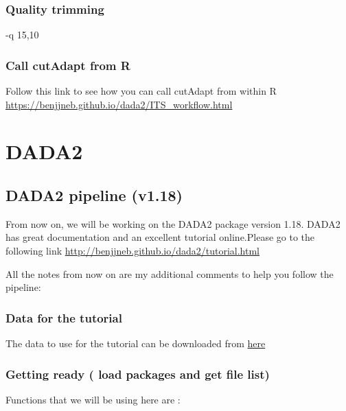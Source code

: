 \documentclass[
]{book}
\begin{document}
\hypertarget{quality-trimming}{%
\subsection{Quality trimming}\label{quality-trimming}}

-q 15,10

\hypertarget{call-cutadapt-from-r}{%
\subsection{Call cutAdapt from R}\label{call-cutadapt-from-r}}

Follow this link to see how you can call cutAdapt from within R
\url{https://benjjneb.github.io/dada2/ITS_workflow.html}

\hypertarget{dada2}{%
\chapter{DADA2}\label{dada2}}

\hypertarget{dada2-pipeline-v1.18}{%
\section{DADA2 pipeline (v1.18)}\label{dada2-pipeline-v1.18}}

From now on, we will be working on the DADA2 package version 1.18. DADA2 has great documentation and an excellent tutorial online.Please go to the following link \url{http://benjjneb.github.io/dada2/tutorial.html}

All the notes from now on are my additional comments to help you follow the pipeline:

\hypertarget{data-for-the-tutorial}{%
\subsection{Data for the tutorial}\label{data-for-the-tutorial}}

The data to use for the tutorial can be downloaded from \href{MiSeqSOPData.zip}{here}

\hypertarget{getting-ready-load-packages-and-get-file-list}{%
\subsection{Getting ready ( load packages and get file list)}\label{getting-ready-load-packages-and-get-file-list}}

Functions that we will be using here are :
\end{document}
